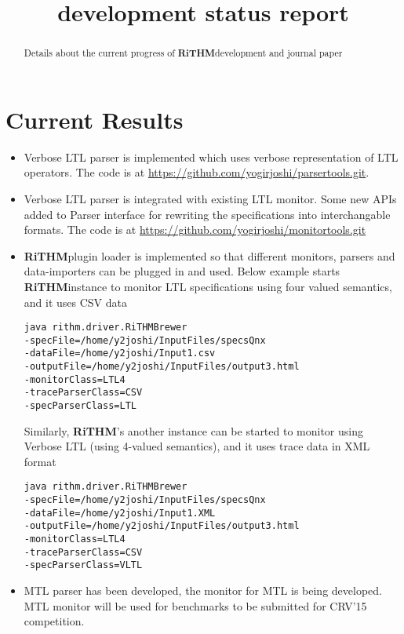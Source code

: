 \documentclass[]{article}
\title{\rithm development status report}
\author{}
\newcommand{\rithm}{\textbf{RiTHM}\space}
\begin{document}
\maketitle

\begin{abstract}
Details about the current progress of \rithm development and journal paper
\end{abstract}
\section{Current Results}
\begin{itemize}
\item
Verbose LTL parser is implemented which uses verbose representation of LTL operators. \newline
The code is at \url{https://github.com/yogirjoshi/parsertools.git}.

\item
Verbose LTL parser is integrated with existing LTL monitor. Some new APIs added to Parser interface for rewriting the specifications into interchangable formats. The code is at \url{https://github.com/yogirjoshi/monitortools.git}

\item
\rithm plugin loader is implemented so that different monitors, parsers and data-importers can be plugged in and used. \newline
Below example starts \rithm instance to monitor LTL specifications using four valued semantics, and it uses CSV data
\begin{lstlisting}
java rithm.driver.RiTHMBrewer 
-specFile=/home/y2joshi/InputFiles/specsQnx 
-dataFile=/home/y2joshi/Input1.csv
-outputFile=/home/y2joshi/InputFiles/output3.html 
-monitorClass=LTL4 
-traceParserClass=CSV 
-specParserClass=LTL
\end{lstlisting}
Similarly, \rithm's another instance can be started to monitor using Verbose LTL (using 4-valued semantics), and it uses trace data in XML format 
\begin{lstlisting}
java rithm.driver.RiTHMBrewer 
-specFile=/home/y2joshi/InputFiles/specsQnx 
-dataFile=/home/y2joshi/Input1.XML
-outputFile=/home/y2joshi/InputFiles/output3.html 
-monitorClass=LTL4 
-traceParserClass=CSV 
-specParserClass=VLTL
\end{lstlisting}
\item
MTL parser has been developed, the monitor for MTL is being developed. MTL monitor will be used for benchmarks to be submitted for CRV'15 competition.


\end{itemize}
\end{document}

